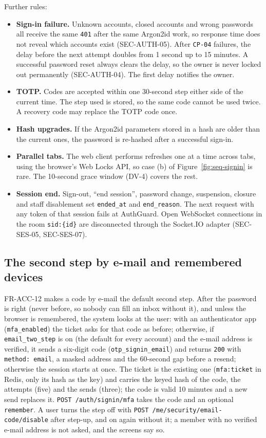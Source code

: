 \documentclass[11pt,a4paper]{article}
\begin{document}
Further rules:
\begin{itemize}[nosep]
  \item \textbf{Sign-in failure.} Unknown accounts, closed accounts and wrong passwords all receive the same \texttt{401} after the same Argon2id work, so response time does not reveal which accounts exist (SEC-AUTH-05). After \texttt{CP-04} failures, the delay before the next attempt doubles from 1 second up to 15 minutes. A successful password reset always clears the delay, so the owner is never locked out permanently (SEC-AUTH-04). The first delay notifies the owner.
  \item \textbf{TOTP.} Codes are accepted within one 30-second step either side of the current time. The step used is stored, so the same code cannot be used twice. A recovery code may replace the TOTP code once.
  \item \textbf{Hash upgrades.} If the Argon2id parameters stored in a hash are older than the current ones, the password is re-hashed after a successful sign-in.
  \item \textbf{Parallel tabs.} The web client performs refreshes one at a time across tabs, using the browser's Web Locks API, so case (b) of Figure~\ref{fig:seq-signin} is rare. The 10-second grace window (DV-4) covers the rest.
  \item \textbf{Session end.} Sign-out, ``end session'', password change, suspension, closure and staff disablement set \texttt{ended\_at} and \texttt{end\_reason}. The next request with any token of that session fails at AuthGuard. Open WebSocket connections in the room \texttt{sid:\{id\}} are disconnected through the Socket.IO adapter (SEC-SES-05, SEC-SES-07).
\end{itemize}

\subsection{The second step by e-mail and remembered devices}
\label{sec:signin-email-code}
FR-ACC-12 makes a code by e-mail the default second step. After the password is right (never before, so nobody can fill an inbox without it), and unless the browser is remembered, the system looks at the user: with an authenticator app (\texttt{mfa\_enabled}) the ticket asks for that code as before; otherwise, if \texttt{email\_two\_step} is on (the default for every account) and the e-mail address is verified, it sends a six-digit code (\texttt{otp\_signin\_email}) and returns \texttt{200} with \texttt{method: email}, a masked address and the 60-second gap before a resend; otherwise the session starts at once. The ticket is the existing one (\texttt{mfa:ticket} in Redis, only its hash as the key) and carries the keyed hash of the code, the attempts (five) and the sends (three); the code is valid 10 minutes and a new send replaces it. \texttt{POST /auth/signin/mfa} takes the code and an optional \texttt{remember}. A user turns the step off with \texttt{POST /me/security/email-code/disable} after step-up, and on again without it; a member with no verified e-mail address is not asked, and the screens say so.
\end{document}
